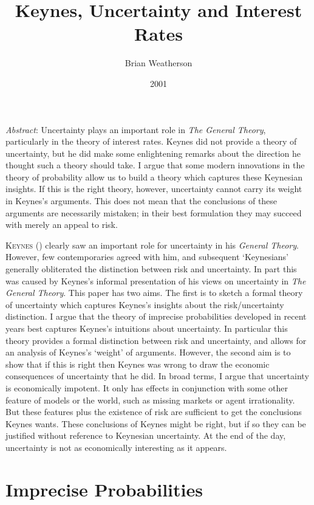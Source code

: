 \documentclass[
  11pt,
  letterpaper,
  DIV=11,
  numbers=noendperiod,
  twoside]{scrartcl}
\title{Keynes, Uncertainty and Interest Rates}
\author{Brian Weatherson}
\date{2001}
\renewenvironment{abstract}
 {\vspace{-1.25cm}
 \quotation\small\noindent\emph{Abstract}:}
 {\endquotation}
\renewenvironment{abstract}
 {\quotation\small\noindent\emph{Abstract}:}
 {\endquotation\vspace{-0.02cm}}
\begin{document}
\maketitle
\begin{abstract}
Uncertainty plays an important role in \emph{The General Theory},
particularly in the theory of interest rates. Keynes did not provide a
theory of uncertainty, but he did make some enlightening remarks about
the direction he thought such a theory should take. I argue that some
modern innovations in the theory of probability allow us to build a
theory which captures these Keynesian insights. If this is the right
theory, however, uncertainty cannot carry its weight in Keynes's
arguments. This does not mean that the conclusions of these arguments
are necessarily mistaken; in their best formulation they may succeed
with merely an appeal to risk.
\end{abstract}


\lettrine{K}{eynes} () clearly saw an
important role for uncertainty in his \emph{General Theory}. However,
few contemporaries agreed with him, and subsequent `Keynesians'
generally obliterated the distinction between risk and uncertainty. In
part this was caused by Keynes's informal presentation of his views on
uncertainty in \emph{The General Theory}. This paper has two aims. The
first is to sketch a formal theory of uncertainty which captures
Keynes's insights about the risk/uncertainty distinction. I argue that
the theory of imprecise probabilities developed in recent years best
captures Keynes's intuitions about uncertainty. In particular this
theory provides a formal distinction between risk and uncertainty, and
allows for an analysis of Keynes's `weight' of arguments. However, the
second aim is to show that if this is right then Keynes was wrong to
draw the economic consequences of uncertainty that he did. In broad
terms, I argue that uncertainty is economically impotent. It only has
effects in conjunction with some other feature of models or the world,
such as missing markets or agent irrationality. But these features plus
the existence of risk are sufficient to get the conclusions Keynes
wants. These conclusions of Keynes might be right, but if so they can be
justified without reference to Keynesian uncertainty. At the end of the
day, uncertainty is not as economically interesting as it appears.

\section{Imprecise Probabilities}\label{imprecise-probabilities}
\end{document}
